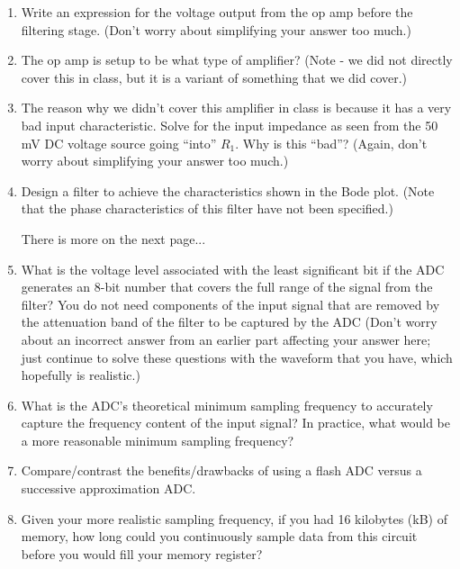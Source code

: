 \documentclass[12pt]{article}
\begin{document}
\begin{enumerate}
\item Write an expression for the voltage output from the op amp before the
filtering stage.  (Don't worry about simplifying your answer too much.)
\item The op amp is setup to be what type of amplifier?  (Note - we did not directly cover this in class, but it is a variant of something that we did cover.)
\item The reason why we didn't cover this amplifier in class is because it has
a very bad input characteristic.  Solve for the input impedance as seen from
the 50 mV DC voltage source going ``into'' $R_1$.  Why is this ``bad''?
(Again, don't worry about simplifying your answer too much.)
\item Design a filter to achieve the characteristics shown in the Bode plot.
(Note that the phase characteristics of this filter have not been specified.)

\hfill{There is more on the next page...}
\clearpage



\item What is the voltage level associated with the least significant bit if
the ADC generates an 8-bit number that covers the full range of the signal from
the filter?  You do not need components of the input signal that are removed by
the attenuation band of the filter to be captured by the ADC (Don't worry about
an incorrect answer from an earlier part affecting your answer here; just
continue to solve these questions with the waveform that you have, which
hopefully is realistic.)
\item What is the ADC's theoretical minimum sampling frequency to accurately
capture the frequency content of the input signal?  In practice, what would be
a more reasonable minimum sampling frequency?
\item Compare/contrast the benefits/drawbacks of using a flash ADC versus a
successive approximation ADC.
\item Given your more realistic sampling frequency, if you had 16 kilobytes
(kB) of memory, how long could you continuously sample data from this circuit
before you would fill your memory register?
\end{enumerate}

\clearpage



\clearpage


\end{document}
